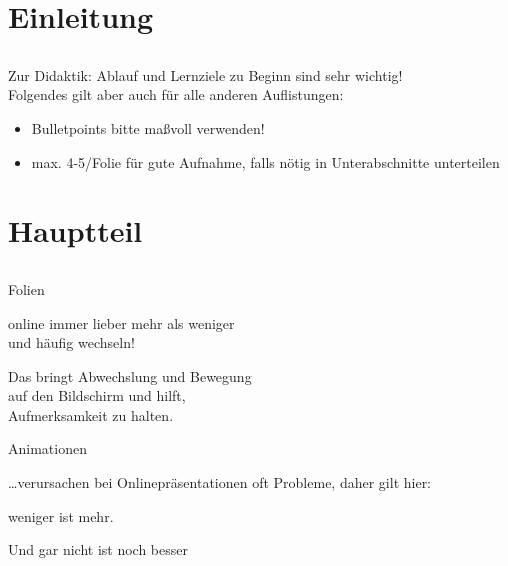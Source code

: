 \documentclass{beamer}
\begin{document}
\section{Einleitung}

\subsection*{}

\begin{frame}
	\begin{block}{Zur Didaktik: Ablauf und Lernziele zu Beginn sind sehr wichtig!\\
		\small Folgendes gilt aber auch für alle anderen Auflistungen:}
		\begin{itemize}
			\item Bulletpoints bitte maßvoll verwenden! 
			\item max. 4-5/Folie für gute Aufnahme, falls nötig in Unterabschnitte unterteilen
		\end{itemize}
	\end{block}
\end{frame}

\section{Hauptteil}

\subsection*{}

\begin{frame}{Folien}
	\begin{center}
		\Large
		online immer lieber {\Huge mehr} als weniger\\
		und häufig wechseln!
	\end{center}
	\pause
	\begin{center}
		\Large
		Das bringt Abwechslung und Bewegung\\auf
        den Bildschirm und hilft,\\
        {\Huge Aufmerksamkeit} zu {\Huge halten}.
	\end{center}
\end{frame}

\begin{frame}{Animationen}
	\begin{center}
		\Large
		\ldots verursachen bei Onlinepräsentationen oft Probleme, daher gilt hier:
	\end{center}
	\begin{center}
		\Huge
weniger ist mehr.
	\end{center}
	\pause
	\begin{center}
		Und gar nicht ist noch besser
	\end{center}
\end{frame}
\end{document}
